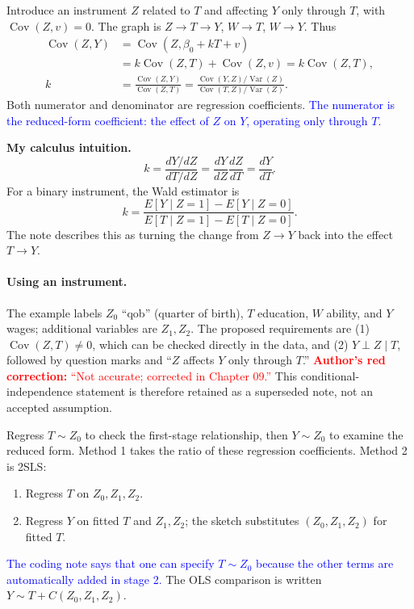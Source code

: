 \documentclass[11pt,a4paper]{article}
\newcommand{\inkblue}[1]{\textcolor{blue}{#1}}
\newcommand{\inkred}[1]{\textcolor{red}{#1}}
\begin{document}
{Introduce an instrument $Z$ related to $T$ and affecting $Y$ only through $T$, with $\operatorname{Cov}(Z,v)=0$. The graph is $Z\to T\to Y$, $W\to T$, $W\to Y$. Thus
\begin{align*}
\operatorname{Cov}(Z,Y)&=\operatorname{Cov}(Z,\beta_0+kT+v)\\
&=k\operatorname{Cov}(Z,T)+\operatorname{Cov}(Z,v)=k\operatorname{Cov}(Z,T),\\
k&=\frac{\operatorname{Cov}(Z,Y)}{\operatorname{Cov}(Z,T)}
=\frac{\operatorname{Cov}(Y,Z)/\operatorname{Var}(Z)}{\operatorname{Cov}(T,Z)/\operatorname{Var}(Z)}.
\end{align*}
Both numerator and denominator are regression coefficients. \inkblue{The numerator is the reduced-form coefficient: the effect of $Z$ on $Y$, operating only through $T$.}

\textbf{My calculus intuition.}
\[k=\frac{dY/dZ}{dT/dZ}=\frac{dY}{dZ}\frac{dZ}{dT}=\frac{dY}{dT}.\]
For a binary instrument, the Wald estimator is
\[k=\frac{E[Y\mid Z=1]-E[Y\mid Z=0]}{E[T\mid Z=1]-E[T\mid Z=0]}.\]
The note describes this as turning the change from $Z\to Y$ back into the effect $T\to Y$.

\paragraph{Using an instrument.}
The example labels $Z_0$ ``qob'' (quarter of birth), $T$ education, $W$ ability, and $Y$ wages; additional variables are $Z_1,Z_2$. The proposed requirements are (1) $\operatorname{Cov}(Z,T)\ne0$, which can be checked directly in the data, and (2) $Y\perp Z\mid T$, followed by question marks and ``$Z$ affects $Y$ only through $T$.'' \inkred{\textbf{Author's red correction:} ``Not accurate; corrected in Chapter 09.''} This conditional-independence statement is therefore retained as a superseded note, not an accepted assumption.

Regress $T\sim Z_0$ to check the first-stage relationship, then $Y\sim Z_0$ to examine the reduced form. Method 1 takes the ratio of these regression coefficients. Method 2 is 2SLS:
\begin{enumerate}
\item Regress $T$ on $Z_0,Z_1,Z_2$.
\item Regress $Y$ on fitted $T$ and $Z_1,Z_2$; the sketch substitutes $(Z_0,Z_1,Z_2)$ for fitted $T$.
\end{enumerate}
\inkblue{The coding note says that one can specify $T\sim Z_0$ because the other terms are automatically added in stage 2.} The OLS comparison is written $Y\sim T+C(Z_0,Z_1,Z_2)$.

}
\end{document}
